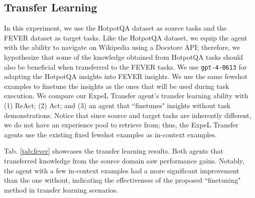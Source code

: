 \documentclass[letterpaper]{article} %
\begin{document}
\subsection{Transfer Learning}
\label{sec:transfer}
In this experiment, we use the HotpotQA dataset \cite{yang2018hotpotqa} as source tasks and the FEVER dataset \cite{thorne2018fever} as target tasks. Like the HotpotQA dataset, we equip the agent with the ability to navigate on Wikipedia using a Docstore API; therefore, we hypothesize that some of the knowledge obtained from HotpotQA tasks should also be beneficial when transferred to the FEVER tasks. We use \texttt{gpt-4-0613} for adapting the HotpotQA insights into FEVER insights. We use the same fewshot examples to finetune the insights as the ones that will be used during task execution. We compare our ExpeL Transfer agent's transfer learning ability with (1) ReAct; (2) Act; and (3) an agent that ``finetunes" insights without task demonstrations. Notice that since source and target tasks are inherently different, we do not have an experience pool to retrieve from; thus, the ExpeL Transfer agents use the existing fixed fewshot examples as in-context examples.

Tab. \ref{tab:fever} showcases the transfer learning results. Both agents that transferred knowledge from the source domain saw performance gains. Notably, the agent with a few in-context examples had a more significant improvement than the one without, indicating the effectiveness of the proposed ``finetuning" method in transfer learning scenarios.

\begin{table}
    \centering
    \caption{\textbf{Transfer Results.} We transfer insights extracted from HotpotQA to FEVER. \textit{Act} and \textit{ReAct} are baseline agents, \textit{ExpeL w/o Task Demos} does not utilize fewshot examples when altering the insights for the target task.}
    \label{tab:fever}
\end{table}
\end{document}
